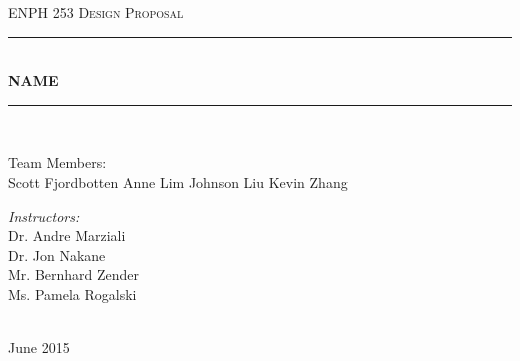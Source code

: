 \documentclass[11pt, oneside]{article} %
\newcommand{\robotname}{NAME}
\begin{document}

\newcommand{\HRule}{\rule{\linewidth}{0.5mm}} %


\begin{titlepage}
\begin{center}

\textsc{\LARGE ENPH 253 Design Proposal}\\[1.5cm]

\HRule \\[0.4cm] %
{\huge \bfseries \robotname}\\[0.07cm]
\HRule \\[1.5cm] %

\begin{minipage}[t]{0.4\textwidth}
\begin{flushleft} \large
Team Members: \\
{Scott Fjordbotten \newline Anne Lim \newline Johnson Liu \newline Kevin Zhang} %
\end{flushleft}
\end{minipage}
\begin{minipage}[t]{0.4\textwidth}
\begin{flushright} \large
\emph{Instructors:} \\
{Dr. Andre Marziali \\ Dr. Jon Nakane \\ Mr. Bernhard Zender \\ Ms. Pamela Rogalski } %
\end{flushright}
\end{minipage}\\[3cm]
 
 
{\large June 2015}\\[4cm]
 
\vfill
\end{center}

\end{titlepage}


\end{document}
